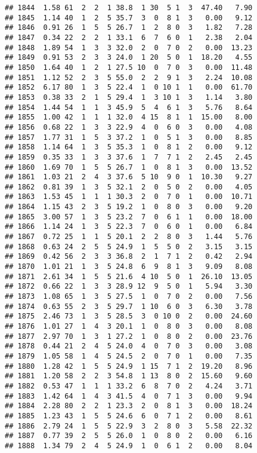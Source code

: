 \documentclass[
]{article}
\begin{document}
\begin{verbatim}
## 1844  1.58 61  2  2  1 38.8  1 30  5 1  3  47.40   7.90
## 1845  1.14 40  1  2  5 35.7  3  0  8 1  3   0.00   9.12
## 1846  0.91 26  1  5  5 26.7  1  2  8 0  3   1.82   7.28
## 1847  0.34 22  2  2  1 33.1  6  7  6 0  1   2.38   2.04
## 1848  1.89 54  1  3  3 32.0  2  0  7 0  2   0.00  13.23
## 1849  0.91 53  2  3  3 24.0  1 20  5 0  1  18.20   4.55
## 1850  1.64 40  1  2  1 27.5 10  0  7 0  3   0.00  11.48
## 1851  1.12 52  2  3  5 55.0  2  2  9 1  3   2.24  10.08
## 1852  6.17 80  1  3  5 22.4  1  0 10 1  1   0.00  61.70
## 1853  0.38 33  2  1  5 29.4  1  3 10 1  3   1.14   3.80
## 1854  1.44 54  1  1  3 45.9  5  4  6 1  3   5.76   8.64
## 1855  1.00 42  1  1  1 32.0  4 15  8 1  1  15.00   8.00
## 1856  0.68 22  1  3  3 22.9  4  0  6 0  3   0.00   4.08
## 1857  1.77 31  1  5  3 37.2  1  0  5 1  3   0.00   8.85
## 1858  1.14 64  1  3  5 35.3  1  0  8 1  2   0.00   9.12
## 1859  0.35 33  1  3  3 37.6  1  7  7 1  2   2.45   2.45
## 1860  1.69 70  1  5  5 26.7  1  0  8 1  3   0.00  13.52
## 1861  1.03 21  2  4  3 37.6  5 10  9 0  1  10.30   9.27
## 1862  0.81 39  1  3  5 32.1  2  0  5 0  2   0.00   4.05
## 1863  1.53 45  1  1  1 30.3  2  0  7 0  1   0.00  10.71
## 1864  1.15 43  2  3  5 19.2  1  0  8 0  3   0.00   9.20
## 1865  3.00 57  1  3  5 23.2  7  0  6 1  1   0.00  18.00
## 1866  1.14 24  1  3  5 22.3  7  0  6 0  1   0.00   6.84
## 1867  0.72 25  1  1  5 20.1  2  2  8 0  3   1.44   5.76
## 1868  0.63 24  2  5  5 24.9  1  5  5 0  2   3.15   3.15
## 1869  0.42 56  2  3  3 36.8  2  1  7 1  2   0.42   2.94
## 1870  1.01 21  1  3  5 24.8  6  9  8 1  3   9.09   8.08
## 1871  2.61 34  1  5  5 21.6  4 10  5 0  1  26.10  13.05
## 1872  0.66 22  1  3  3 28.9 12  9  5 0  1   5.94   3.30
## 1873  1.08 65  1  3  5 27.5  1  0  7 0  2   0.00   7.56
## 1874  0.63 55  2  3  5 29.7  1 10  6 0  3   6.30   3.78
## 1875  2.46 73  1  3  5 28.5  3  0 10 0  2   0.00  24.60
## 1876  1.01 27  1  4  3 20.1  1  0  8 0  3   0.00   8.08
## 1877  2.97 70  1  3  1 27.2  1  0  8 0  2   0.00  23.76
## 1878  0.44 21  2  4  5 24.0  4  0  7 0  3   0.00   3.08
## 1879  1.05 58  1  4  5 24.5  2  0  7 0  1   0.00   7.35
## 1880  1.28 42  1  5  5 24.9  1 15  7 1  2  19.20   8.96
## 1881  1.20 58  2  2  3 54.8  1 13  8 0  2  15.60   9.60
## 1882  0.53 47  1  1  1 33.2  6  8  7 0  2   4.24   3.71
## 1883  1.42 64  1  4  3 41.5  4  0  7 1  3   0.00   9.94
## 1884  2.28 80  2  2  1 23.3  2  0  8 1  3   0.00  18.24
## 1885  1.23 43  1  5  5 24.6  6  0  7 1  2   0.00   8.61
## 1886  2.79 24  1  5  5 22.9  3  2  8 0  3   5.58  22.32
## 1887  0.77 39  2  5  5 26.0  1  0  8 0  2   0.00   6.16
## 1888  1.34 79  2  4  5 24.9  1  0  6 1  2   0.00   8.04

\end{verbatim}
\end{document}
